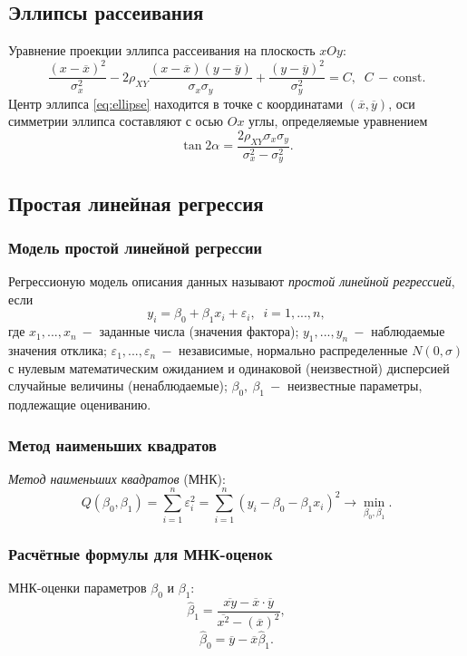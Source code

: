 \documentclass[a4paper]{article}
\begin{document}
\subsection{Эллипсы рассеивания}
Уравнение проекции эллипса рассеивания на плоскость $xOy$:
\begin{equation}\label{eq:ellipse}
    \frac{\left(x-\overline{x}\right)^2}{\sigma_x^2}-2\rho_{XY}^{}\frac{(x-\overline{x})(y-\overline{y})}{\sigma_x\sigma_y}+\frac{\left(y-\overline{y}\right)^2}{\sigma_y^2}=C,\;\;C\,-\,\text{const}.
\end{equation}
Центр эллипса \eqref{eq:ellipse} находится в точке с координатами $(\overline{x},\overline{y})$, оси симметрии эллипса составляют с осью $Ox$ углы, определяемые уравнением
\begin{equation}
    \tan{2\alpha}=\frac{2\rho_{XY}^{}\sigma_x\sigma_y}{\sigma_x^2-\sigma_y^2}.
\end{equation}
\subsection{Простая линейная регрессия}
\subsubsection{Модель простой линейной регрессии}
Регрессионую модель описания данных называют \textit{простой линейной регрессией}, если
\begin{equation}
    y_i=\beta_0 + \beta_1 x_i + \varepsilon_i,\;\;i=1,...,n,
\end{equation}
где $x_1, ..., x_n\:-$ заданные числа (значения фактора); $y_1,...,y_n\:-$ наблюдаемые значения отклика; $\varepsilon_1,...,\varepsilon_n\:-$ независимые, нормально распределенные $N(0,\sigma)$ с нулевым математическим ожиданием и одинаковой (неизвестной) дисперсией случайные величины (ненаблюдаемые); $\beta_0,\:\beta_1\:-$ неизвестные параметры, подлежащие оцениванию.
\subsubsection{Метод наименьших квадратов}
\textit{Метод наименьших квадратов} (МНК):
\begin{equation}
    Q\left(\beta_0,\beta_1\right)=\sum_{i=1}^n \varepsilon_i^2= \sum_{i=1}^n\left(y_i-\beta_0-\beta_1 x_i\right)^2\to\min_{\beta_0,\beta_1}.
\end{equation}
\subsubsection{Расчётные формулы для МНК-оценок}
МНК-оценки параметров $\beta_0$ и $\beta_1$:
\begin{equation}
    \widehat{\beta}_1=\frac{\overline{xy}-\overline{x}\cdot\overline{y}}{\overline{x^2}-(\overline{x})^2},
\end{equation}
\begin{equation}
    \widehat{\beta}_0=\overline{y}-\overline{x}\widehat{\beta}_1.
\end{equation}
\end{document}
